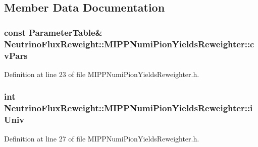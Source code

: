 \subsection{Member Data Documentation}
\hypertarget{class_neutrino_flux_reweight_1_1_m_i_p_p_numi_pion_yields_reweighter_a127384f58575ad94c986aac85ea6fbe6}{
\subsubsection[{cv\-Pars}]{\setlength{\rightskip}{0pt plus 5cm}const {\bf Parameter\-Table}\& Neutrino\-Flux\-Reweight\-::\-M\-I\-P\-P\-Numi\-Pion\-Yields\-Reweighter\-::cv\-Pars}}\label{class_neutrino_flux_reweight_1_1_m_i_p_p_numi_pion_yields_reweighter_a127384f58575ad94c986aac85ea6fbe6}


Definition at line 23 of file M\-I\-P\-P\-Numi\-Pion\-Yields\-Reweighter.\-h.

\hypertarget{class_neutrino_flux_reweight_1_1_m_i_p_p_numi_pion_yields_reweighter_a1ff57841eaa437aeb11a9793a64e47c2}{
\subsubsection[{i\-Univ}]{\setlength{\rightskip}{0pt plus 5cm}int Neutrino\-Flux\-Reweight\-::\-M\-I\-P\-P\-Numi\-Pion\-Yields\-Reweighter\-::i\-Univ\hspace{0.3cm}{\ttfamily [private]}}}\label{class_neutrino_flux_reweight_1_1_m_i_p_p_numi_pion_yields_reweighter_a1ff57841eaa437aeb11a9793a64e47c2}


Definition at line 27 of file M\-I\-P\-P\-Numi\-Pion\-Yields\-Reweighter.\-h.

